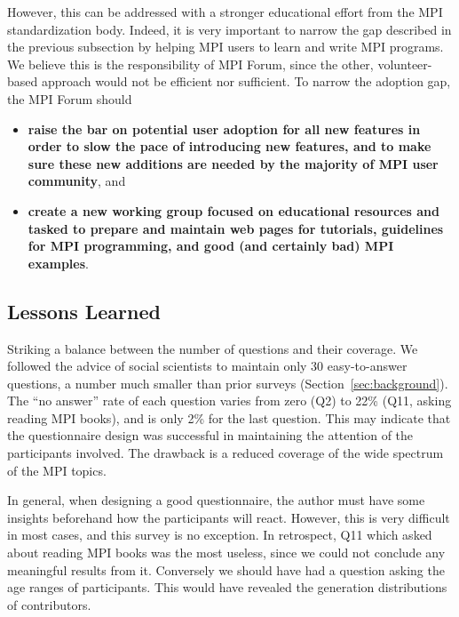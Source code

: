 \documentclass[preprint,5p,times]{elsarticle}
\newcommand{\revision}[2]{{\color{blue}#2}}
\begin{document}
{However, this can be  addressed with a stronger educational effort from the MPI
standardization body. Indeed, it is very important to narrow the gap described in
the previous subsection by helping MPI users to learn and write MPI programs. We
believe this is the responsibility of MPI Forum, since the other,
volunteer-based approach would not be efficient nor sufficient. To narrow the
adoption gap, the MPI Forum should

\begin{itemize}[leftmargin=3ex]
%
\item {\bf raise the bar on potential user adoption for all new features in
order to slow the pace of introducing new features, and to make sure
these new additions are needed by the majority of MPI user community},
  and
%
\item {\bf create a new working group focused on educational resources and
tasked to prepare and maintain web pages for tutorials, guidelines for MPI
programming, and good (and certainly bad) MPI examples}.
\end{itemize}

\revision{}{
  \vspace{3mm}
\subsection{Lessons Learned}

\begin{description}[leftmargin=0cm]

\item[Design Strategy]
Striking a balance between the number of questions and their coverage.
We followed the advice of social scientists to maintain
only 30 easy-to-answer questions, a number much smaller than prior
surveys (Section~\ref{sec:background}).
%
The ``no answer'' rate of each
question varies from zero (Q2) to 22\% (Q11, asking reading MPI
books), and is only 2\% for the last question.
This may indicate that the questionnaire design was successful in
maintaining the attention of the participants involved. The drawback is a reduced
coverage of the wide spectrum of the MPI topics.

\item[Questionnaire Design]
In general, when designing a good questionnaire, the author must have
some insights beforehand how the participants will react. However,
this is very difficult in most cases, and this survey is no
exception. In retrospect, Q11 which asked about reading MPI
books was the most useless, since we could not conclude any meaningful
results from it. Conversely we should have had a question asking the age
ranges of participants. This would have revealed the generation
distributions of contributors.


\end{description}}}
\end{document}
